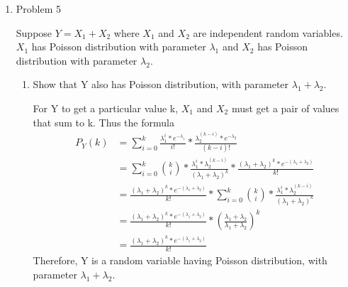 \documentclass[letterpaper]{article}
\begin{document}
\begin{enumerate}
\medskip
\newpage

\item{Problem 5}
\begin{mdframed}
Suppose $Y = X_1 + X_2$ where $X_1$ and $X_2$ are independent random variables. $X_1$ has Poisson distribution with parameter $\lambda_1$ and $X_2$ has Poisson distribution with parameter $\lambda_2$.
\end{mdframed}
\begin{enumerate}
\item{} Show that Y also has Poisson distribution, with parameter $\lambda_1 + \lambda_2$.

For Y to get a particular value k, $X_1$ and $X_2$ must get a pair of values that sum to k. Thus the formula
\begin{equation}
\begin{split}
P_Y(k) &= \sum_{i = 0}^{k}{\frac{\lambda_1^i * e^{-\lambda_1}}{i!} * \frac{\lambda_2^{(k - i)} * e^{-\lambda_2}}{(k - i)!}}\\
           &= \sum_{i = 0}^{k}{{k \choose i} * \frac{\lambda_1^i * \lambda_2^{(k - i)}}{(\lambda_1 + \lambda_2)^k} * \frac{(\lambda_1 + \lambda_2)^k * e^{-(\lambda_1 + \lambda_2)}}{k!}}\\
           &=  \frac{(\lambda_1 + \lambda_2)^k * e^{-(\lambda_1 + \lambda_2)}}{k!} * \sum_{i = 0}^{k}{{k \choose i} * \frac{\lambda_1^i * \lambda_2^{(k - i)}}{(\lambda_1 + \lambda_2)^k}}\\
           &=  \frac{(\lambda_1 + \lambda_2)^k * e^{-(\lambda_1 + \lambda_2)}}{k!} * (\frac{\lambda_1 + \lambda_2}{\lambda_1 + \lambda_2})^k\\
           &=  \frac{(\lambda_1 + \lambda_2)^k * e^{-(\lambda_1 + \lambda_2)}}{k!}
\end{split}
\end{equation}
Therefore, Y is a random variable having Poisson distribution, with parameter $\lambda_1 + \lambda_2$.


\end{enumerate}
\end{enumerate}
\end{document}
